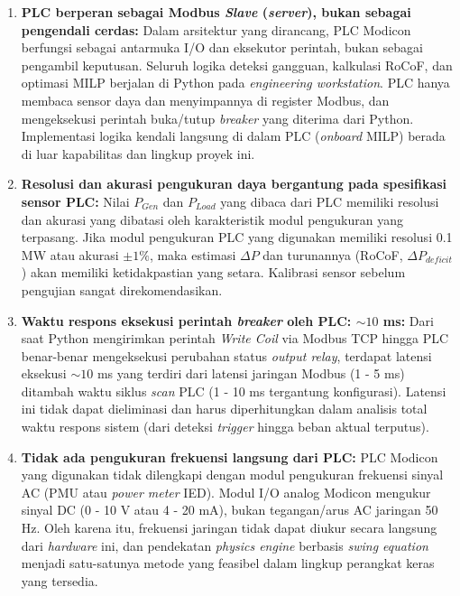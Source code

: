 \begin{enumerate}
    \item[a.] \textbf{PLC berperan sebagai Modbus \textit{Slave} (\textit{server}), bukan sebagai pengendali cerdas:} Dalam arsitektur yang dirancang, PLC Modicon berfungsi sebagai antarmuka I/O dan eksekutor perintah, bukan sebagai pengambil keputusan. Seluruh logika deteksi gangguan, kalkulasi RoCoF, dan optimasi MILP berjalan di Python pada \textit{engineering workstation}. PLC hanya membaca sensor daya dan menyimpannya di register Modbus, dan mengeksekusi perintah buka/tutup \textit{breaker} yang diterima dari Python. Implementasi logika kendali langsung di dalam PLC (\textit{onboard} MILP) berada di luar kapabilitas dan lingkup proyek ini.
    \item[b.] \textbf{Resolusi dan akurasi pengukuran daya bergantung pada spesifikasi sensor PLC:} Nilai $P_{Gen}$ dan $P_{Load}$ yang dibaca dari PLC memiliki resolusi dan akurasi yang dibatasi oleh karakteristik modul pengukuran yang terpasang. Jika modul pengukuran PLC yang digunakan memiliki resolusi 0.1 MW atau akurasi $\pm 1\%$, maka estimasi $\Delta P$ dan turunannya (RoCoF, $\Delta P_{deficit}$) akan memiliki ketidakpastian yang setara. Kalibrasi sensor sebelum pengujian sangat direkomendasikan.
    \item[c.] \textbf{Waktu respons eksekusi perintah \textit{breaker} oleh PLC: $\sim 10$ ms:} Dari saat Python mengirimkan perintah \textit{Write Coil} via Modbus TCP hingga PLC benar-benar mengeksekusi perubahan status \textit{output relay}, terdapat latensi eksekusi $\sim 10$ ms yang terdiri dari latensi jaringan Modbus (1 - 5 ms) ditambah waktu siklus \textit{scan} PLC (1 - 10 ms tergantung konfigurasi). Latensi ini tidak dapat dieliminasi dan harus diperhitungkan dalam analisis total waktu respons sistem (dari deteksi \textit{trigger} hingga beban aktual terputus).
    \item[d.] \textbf{Tidak ada pengukuran frekuensi langsung dari PLC:} PLC Modicon yang digunakan tidak dilengkapi dengan modul pengukuran frekuensi sinyal AC (PMU atau \textit{power meter} IED). Modul I/O analog Modicon mengukur sinyal DC (0 - 10 V atau 4 - 20 mA), bukan tegangan/arus AC jaringan 50 Hz. Oleh karena itu, frekuensi jaringan tidak dapat diukur secara langsung dari \textit{hardware} ini, dan pendekatan \textit{physics engine} berbasis \textit{swing equation} menjadi satu-satunya metode yang feasibel dalam lingkup perangkat keras yang tersedia.
\end{enumerate}

